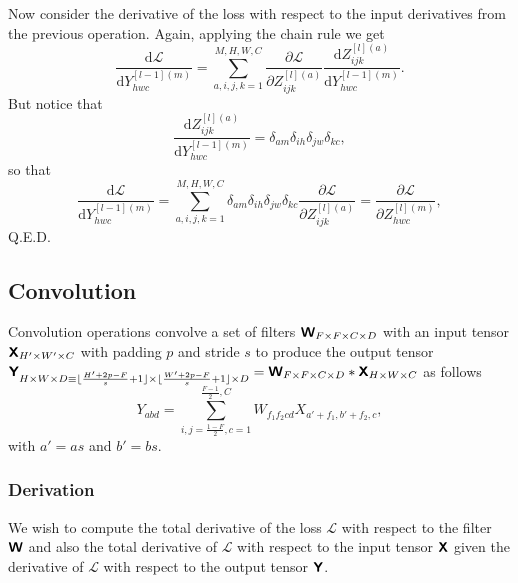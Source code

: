\documentclass[modern]{aastex61}
\newcommand{\uderivative}{\mathrm{d}}
\begin{document}
Now consider the derivative of the loss with respect to the input derivatives from the previous operation. Again, applying the chain rule we get
\begin{equation*}
  \frac{\uderivative \mathscr{L}}{\uderivative Y^{[l-1](m)}_{hwc}} = \sum_{a,i,j,k = 1}^{M,H,W,C} \frac{\partial \mathscr{L}}{\partial Z^{[l](a)}_{ijk}} \frac{\uderivative  Z^{[l](a)}_{ijk}}{\uderivative Y^{[l-1](m)}_{hwc}}.
\end{equation*}
But notice that
\begin{equation*}
  \frac{\uderivative Z^{[l](a)}_{ijk}}{\uderivative Y^{[l-1](m)}_{hwc}} = \delta_{am}\delta_{ih}\delta_{jw}\delta_{kc},
\end{equation*}
so that
\begin{equation*}
  \frac{\uderivative \mathscr{L}}{\uderivative Y^{[l-1](m)}_{hwc}} = \sum_{a,i,j,k = 1}^{M,H,W,C} \delta_{am}\delta_{ih}\delta_{jw}\delta_{kc} \frac{\partial \mathscr{L}}{\partial  Z^{[l](a)}_{ijk}} = \frac{\partial \mathscr{L}}{\partial  Z^{[l](m)}_{hwc}},
\end{equation*}
Q.E.D.

\subsection{Convolution} \label{sec:conv}

Convolution operations convolve a set of filters $\textbf{\textsf{W}}_{F \times F \times C \times D}$ with an input tensor $\textbf{\textsf{X}}_{H' \times W' \times C}$ with padding $p$ and stride $s$ to produce the output tensor $\textbf{\textsf{Y}}_{H \times W \times D \equiv \lfloor \frac{H' + 2p - F}{s} + 1\rfloor \times \lfloor \frac{W' + 2p - F}{s} + 1\rfloor \times D} = \textbf{\textsf{W}}_{F \times F \times C \times D} \ast \textbf{\textsf{X}}_{H \times W \times C}$ as follows
\begin{equation} \label{eq:conv}
  Y_{abd} = \sum^{\frac{F-1}{2},C}_{i,j = \frac{1-F}{2},c=1} W_{f_{1}f_{2}cd} X_{a'+f_{1}, b'+f_{2},c},
\end{equation}
with $a' = as$ and $b' = bs$.

\subsubsection{Derivation}

We wish to compute the total derivative of the loss $\mathscr{L}$ with respect to the filter $\textbf{\textsf{W}}$ and also the total derivative of $\mathscr{L}$ with respect to the input tensor $\textbf{\textsf{X}}$ given the derivative of $\mathscr{L}$ with respect to the output tensor $\textbf{\textsf{Y}}$.
\end{document}

